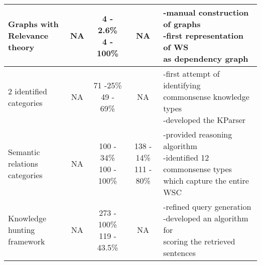 {\begin{tabularx}{\linewidth}{ l| c c c l }
		\makecell{Graphs with \\Relevance theory \cite{DBLP:conf/kr/Schuller14}} & NA  & \makecell{4 - 2.6\% \\ 4 - 100\%} & NA &\makecell[l]{-manual construction of graphs\\-first representation of WS\\ as dependency graph}\\\hline
		
		\makecell{2 identified \\categories \cite{DBLP:conf/ijcai/SharmaVAB15}} & NA  & \makecell{71 -25\% \\ 49 - 69\%} & NA &\makecell[l]{-first attempt of identifying\\commonsense knowledge types \\-developed the KParser} \\\hline
		
		\makecell{Semantic relations\\ categories \cite{2018CommonsenseKT}} & NA &\makecell{100 - 34\% \\ 100 - 100\%} &  \makecell{138 - 14\% \\ 111 - 80\%} &\makecell[l]{-provided reasoning algorithm\\ -identified 12 commonsense types\\ which capture the entire WSC}  \\\hline
		
		\makecell{Knowledge hunting\\ framework \cite{DBLP:conf/emnlp/EmamiCTSC18}}& NA & \makecell{273 - 100\% \\ 119 - 43.5\%} & NA & \makecell[l]{-refined query generation\\-developed an algorithm for \\scoring the retrieved sentences}\\\hline
		
	\end{tabularx}
}